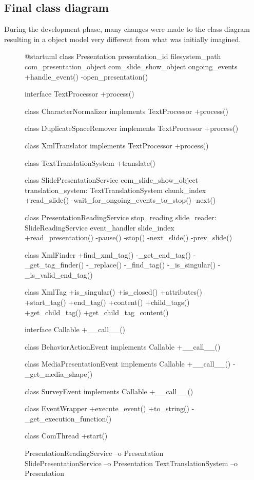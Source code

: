 \documentclass[12pt, fleqn, a4paper]{article}
\begin{document}
\subsection{Final class diagram}
During the development phase, many changes were made to the class diagram resulting in a object model very different from what was initially imagined.
\begin{figure}[H]
	\centering
	\begin{plantuml}
@startuml
class Presentation {
	presentation_id
	filesystem_path
	com_presentation_object
	com_slide_show_object
	ongoing_events
	+handle_event()
	-open_presentation()
}

interface TextProcessor {
	+process()
}

class CharacterNormalizer implements TextProcessor {
	+process()
}

class DuplicateSpaceRemover implements TextProcessor {
	+process()
}

class XmlTranslator implements TextProcessor {
	+process() 
}


class TextTranslationSystem {
	+translate()
}

class SlidePresentationService {
	com_slide_show_object
	translation_system: TextTranslationSystem
	chunk_index
	+read_slide()
	-wait_for_ongoing_events_to_stop()
	-next()
}

class PresentationReadingService {
	stop_reading
	slide_reader: SlideReadingService
	event_handler
	slide_index
	+read_presentation()
	-pause()
	-stop()
	-next_slide()
	-prev_slide()
}

class XmlFinder {
	+find_xml_tag()
	-_get_end_tag()
	-_get_tag_finder()
	-_replace()
	-_find_tag()
	-_is_singular()
	-_is_valid_end_tag()
}

class XmlTag {
	+is_singular()
	+is_closed()
	+attributes()
	+start_tag()
	+end_tag()
	+content()
	+child_tags()
	+get_child_tag()
	+get_child_tag_content()
}

interface Callable {
	+__call__()
}

class BehaviorActionEvent implements Callable {
	+__call__()
}

class MediaPresentationEvent implements Callable {
	+__call__()
	-_get_media_shape()
}

class SurveyEvent implements Callable {
	+__call__()
}

class EventWrapper {
	+execute_event()
	+to_string()
	-_get_execution_function()
}

class ComThread {
	+start()
}

PresentationReadingService --o Presentation
SlidePresentationService --o Presentation
TextTranslationSystem --o Presentation



\end{plantuml}
\end{figure}
\end{document}

